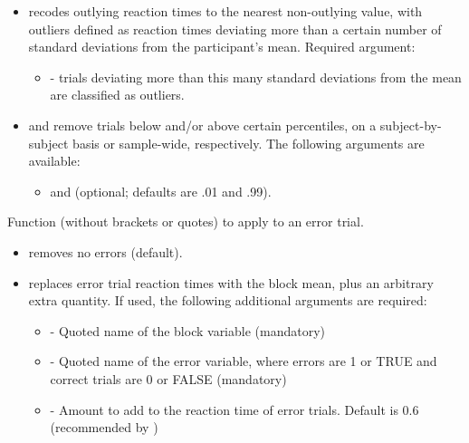 \documentclass[a4paper]{book}
\begin{document}
\begin{Arguments}
\begin{ldescription}
\begin{itemize}
\item{}  recodes outlying reaction times to the nearest non-outlying value,
with outliers defined as reaction times deviating more than a certain number of standard deviations from the participant's mean. Required argument:
\begin{itemize}

\item{}  - trials deviating more than this many standard deviations from the mean are classified as outliers.

\end{itemize}

\item{}  and  remove trials below and/or above certain percentiles,
on a subject-by-subject basis or sample-wide, respectively. The following arguments are available:
\begin{itemize}

\item{}  and  (optional; defaults are .01 and .99).

\end{itemize}


\end{itemize}


\item[\code{errortrialfunc}] Function (without brackets or quotes) to apply to an error trial.

\begin{itemize}

\item{}  removes no errors (default).
\item{}  replaces error trial reaction times with the block mean, plus an arbitrary extra quantity.
If used, the following additional arguments are required:
\begin{itemize}

\item{}  - Quoted name of the block variable (mandatory)
\item{}  - Quoted name of the error variable, where errors are 1 or TRUE and correct trials are 0 or FALSE (mandatory)
\item{}  - Amount to add to the reaction time of error trials. Default is 0.6 (recommended by )


\end{itemize}
\end{itemize}
\end{ldescription}
\end{Arguments}
\end{document}
